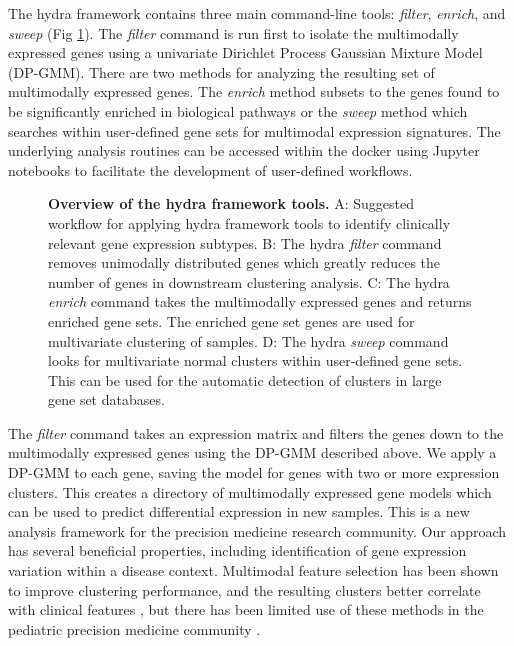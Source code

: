 \documentclass[10pt,letterpaper]{article}
\begin{document}
The hydra framework contains three main command-line tools: \textit{filter}, \textit{enrich}, and \textit{sweep} (Fig \ref{overview}). The \textit{filter} command is run first to isolate the multimodally expressed genes using a univariate Dirichlet Process Gaussian Mixture Model (DP-GMM). There are two methods for analyzing the resulting set of multimodally expressed genes. The \textit{enrich} method subsets to the genes found to be significantly enriched in biological pathways or the \textit{sweep} method which searches within user-defined gene sets for multimodal expression signatures. The underlying analysis routines can be accessed within the docker using Jupyter notebooks to facilitate the development of user-defined workflows.

\begin{figure}[h!]
	\caption{{\bf Overview of the hydra framework tools.}
		A: Suggested workflow for applying hydra framework tools to identify clinically relevant gene expression subtypes. B: The hydra \textit{filter} command removes unimodally distributed genes which greatly reduces the number of genes in downstream clustering analysis. C: The hydra \textit{enrich} command takes the multimodally expressed genes and returns enriched gene sets. The enriched gene set genes are used for multivariate clustering of samples. D: The hydra 
	    \textit{sweep} command looks for multivariate normal clusters within user-defined gene sets. This can be used for the automatic detection of clusters in large gene set databases.
		\label{overview}}
\end{figure}

The \textit{filter} command takes an expression matrix and filters the genes down to the multimodally expressed genes using the DP-GMM described above. We apply a DP-GMM to each gene, saving the model for genes with two or more expression clusters. This creates a directory of multimodally expressed gene models which can be used to predict differential expression in new samples. This is a new analysis framework for the precision medicine research community. Our approach has several beneficial properties, including identification of gene expression variation within a disease context. Multimodal feature selection has been shown to improve clustering performance, and the resulting clusters better correlate with clinical features \cite{yiliMultimodalityCriterionFeature2005}, but there has been limited use of these methods in the pediatric precision medicine community \cite{modyIntegrativeClinicalSequencing2015, worstNextgenerationPersonalisedMedicine2016, obergImplementationNextGeneration2016}.
\end{document}
